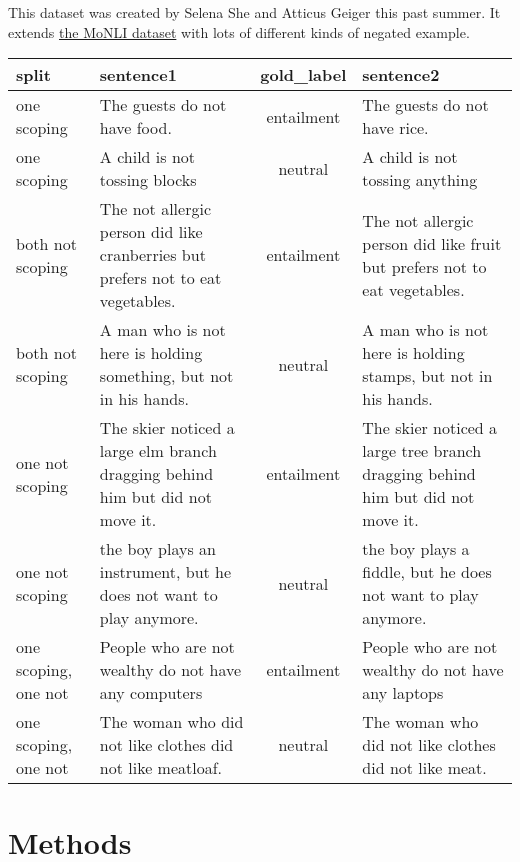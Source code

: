 \documentclass[11pt]{article}
\begin{document}
This dataset was created by Selena She and Atticus Geiger this past
summer. It extends \href{https://github.com/atticusg/MoNLI}{the MoNLI
  dataset} with lots of different kinds of negated example.
%
\begin{center}
  \footnotesize
  \begin{tabular}{@{} l p{} c p{} @{}}
    \toprule
    split &sentence1 &  gold\_label & sentence2 \\
    \midrule
    one scoping &       The guests do not have food. &  entailment &  The guests do not have rice. \\
    one scoping &       A child is not tossing blocks &     neutral & A child is not tossing anything \\\midrule
    both not scoping &  The not allergic person did like cranberries but prefers not to eat vegetables. &  entailment &  The not allergic person did like fruit but prefers not to eat vegetables. \\
    both not scoping &  A man who is not here is holding something, but not in his hands. &     neutral & A man who is not here is holding stamps, but not in his hands. \\\midrule
    one not scoping &   The skier noticed a large elm branch dragging behind him but did not move it. &  entailment &  The skier noticed a large tree branch dragging behind him but did not move it. \\
    one not scoping &   the boy plays an instrument, but he does not want to play anymore. &     neutral & the boy plays a fiddle, but he does not want to play anymore. \\\midrule
    one scoping, one not & People who are not wealthy do not have any computers &  entailment & People who are not wealthy do not have any laptops \\
    one scoping, one not & The woman who did not like clothes did not like meatloaf. &  neutral & The woman who did not like clothes did not like meat. \\
    \bottomrule
  \end{tabular}
\end{center}


\section{Methods}
\end{document}

